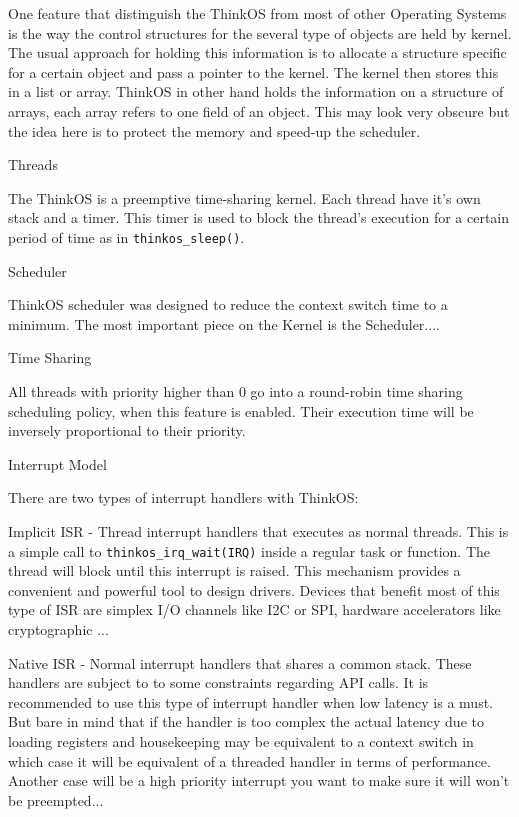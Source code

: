 One feature that distinguish the ThinkOS from most of other Operating Systems is the way the control structures for the several type of objects are held by kernel. The usual approach for holding this information is to allocate a structure specific for a certain object and pass a pointer to the kernel. The kernel then stores this in a list or array. ThinkOS in other hand holds the information on a structure of arrays, each array refers to one field of an object. This may look very obscure but the idea here is to protect the memory and speed-up the scheduler.

Threads

The ThinkOS is a preemptive time-sharing kernel. Each thread have it's own stack and a timer. This timer is used to block the thread's execution for a certain period of time as in \lstinline{thinkos_sleep()}.

Scheduler

ThinkOS scheduler was designed to reduce the context switch time to a minimum. The most important piece on the Kernel is the Scheduler....

Time Sharing

All threads with priority higher than 0 go into a round-robin time sharing scheduling policy, when this feature is enabled. Their execution time will be inversely proportional to their priority.

Interrupt Model

There are two types of interrupt handlers with ThinkOS:

Implicit ISR - Thread interrupt handlers that executes as normal threads. This is a simple call to \lstinline{thinkos_irq_wait(IRQ)} inside a regular task or function. The thread will block until this interrupt is raised. This mechanism provides a convenient and powerful tool to design drivers. Devices that benefit most of this type of ISR are simplex I/O channels like I2C or SPI, hardware accelerators like cryptographic ...

Native ISR - Normal interrupt handlers that shares a common stack. These handlers are subject to to some constraints regarding API calls. It is recommended to use this type of interrupt handler when low latency is a must. But bare in mind that if the handler is too complex the actual latency due to loading registers and housekeeping may be equivalent to a context switch in which case it will be equivalent of a threaded handler in terms of performance. Another case will be a high priority interrupt you want to make sure it will won't be preempted...

